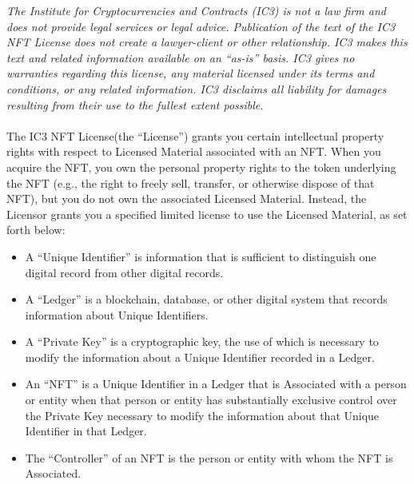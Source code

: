 \documentclass{article}
\newcommand{\iccclicense}{IC3 NFT License\xspace}
\newcommand{\sect}[1]{\vspace{12pt}\noindent{\strong{#1}}}
\newcommand{\subsect}[1]{\vspace{12pt}\noindent{\em{#1}}}
\begin{document}
\begin{sffamily} 
 
\emph{The Institute for Cryptocurrencies and Contracts (IC3) is not a law firm and does not provide legal services or legal advice. Publication of the text of the \iccclicense does not create a lawyer-client or other relationship. IC3 makes this text and related information available on an “as-is” basis. IC3 gives no warranties regarding this license, any material licensed under its terms and conditions, or any related information. IC3 disclaims all liability for damages resulting from their use to the fullest extent possible.}\\\\
The \iccclicense (the ``License'') grants you certain intellectual property rights with respect to Licensed Material associated with an NFT. When you acquire the NFT, you own the personal property rights to the token underlying the NFT (e.g., the right to freely sell, transfer, or otherwise dispose of that  NFT), but you do not own the associated Licensed Material. Instead, the Licensor grants you a specified limited license to use the Licensed Material, as set forth below:

\sect{Definitions}

\subsect{Ledgers and NFTs}


	\begin{itemize}
	\item	A ``Unique Identifier'' is information that is sufficient to distinguish one digital record from other digital records.
		
	\item	A ``Ledger'' is a blockchain, database, or other digital system that records information about Unique Identifiers.
		
	\item	A ``Private Key'' is a cryptographic key, the use of which is necessary to modify the information about a Unique Identifier recorded in a Ledger.
		
	\item	An ``NFT'' is a Unique Identifier in a Ledger that is Associated with a person or entity when that person or entity has substantially exclusive control over the Private Key necessary to modify the information about that Unique Identifier in that Ledger.
		
	\item	The ``Controller'' of an NFT is the person or entity with whom the NFT is Associated.
	\end{itemize}


\end{sffamily}
\end{document}
